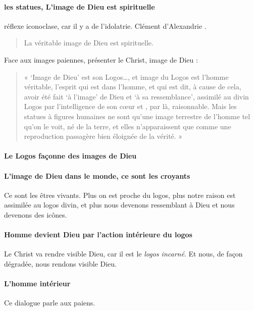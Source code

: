     \paragraph{les statues, L'image de Dieu est spirituelle} réflexe iconoclase, car il y a de l'idolatrie. Clément d'Alexandrie .
\begin{quote}
    La véritable image de Dieu est spirituelle.
\end{quote}    
Face aux images paiennes, présenter le Christ, image de Dieu : 
\begin{quote}
« `Image de Dieu' est son Logos\ldots, et image du Logos est l'homme
véritable, l'esprit qui est dans l'homme, et qui est dit, à cause de
cela, avoir été fait `à l'image' de Dieu et `à sa ressemblance',
assimilé au divin Logos par l'intelligence de son cœur et , par là,
raisonnable. Mais les statues à figures humaines ne sont qu'une image
terrestre de l'homme tel qu'on le voit, né de la terre, et elles
n'apparaissent que comme une reproduction passagère bien éloignée de la
vérité. »
\end{quote}
    
      
      \paragraph{Le Logos façonne des images de Dieu}
      
      \paragraph{L'image de Dieu dans le monde, ce sont les croyants} Ce sont les êtres vivants. Plus on est proche du logos, plus notre raison est assimilée au logos divin, et plus nous devenons ressemblant à Dieu et nous devenons des icônes.
      
      \paragraph{Homme devient Dieu par l'action intérieure du logos} Le Christ va rendre visible Dieu, car il est le \textit{logos incarné}. Et nous, de façon dégradée, nous rendons visible Dieu.
      
      \paragraph{L'homme intérieur} Ce dialogue parle aux paiens. 

